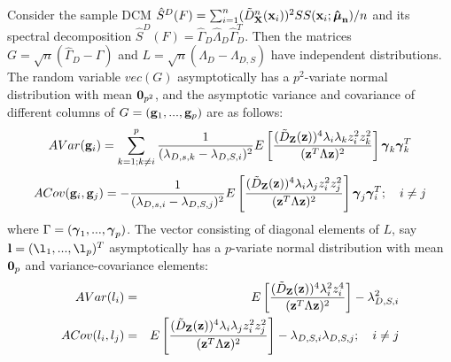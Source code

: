 \documentclass[fleqn,11pt]{article}
\begin{document}
\begin{Corollary} \label{Corollary:eigendist}
Consider the sample DCM $ \hat S^D(F) = \sum_{i=1}^n (\tilde D^n_{\mathbf{X}} ({\bf{x}}_i))^2 SS({\bf{x}}_i; {\bf \hat{{\boldsymbol{\mu}}}_n})/n $ and its spectral decomposition $\hat S^D(F) = \hat\Gamma_D \hat\Lambda_D \hat\Gamma_D^T $. Then the matrices $G = \sqrt n (\hat\Gamma_D - \Gamma) $ and $L = \sqrt n (\hat\Lambda_D - \Lambda_{D,S}) $ have independent distributions. The random variable $vec(G)$ asymptotically has a $p^2$-variate normal distribution with mean ${\bf 0}_{p^2}$, and the asymptotic variance and covariance of different columns of $G = ({\bf{g}}_1,...,{\bf{g}}_p)$ are as follows:
%
\begin{equation} \label{equation:DevEq}
AVar({\bf{g}}_i) = \sum_{k=1; k \neq i}^p \frac{1}{(\lambda_{D,s,k} - \lambda_{D,S,i})^2} E \left[ \frac{(\tilde D_{\mathbf{Z}} ({\bf{z}}))^4 \lambda_i \lambda_k z_i^2 z_k^2}{({\bf{z}}^T \Lambda {\bf{z}})^2} \right] {\boldsymbol{\gamma}}_k {\boldsymbol{\gamma}}_k^T
\end{equation}
%
\begin{equation}
ACov({\bf{g}}_i, {\bf{g}}_j) = - \frac{1}{(\lambda_{D,s,i} - \lambda_{D,S,j})^2} E \left[ \frac{(\tilde D_{\mathbf{Z}} ({\bf{z}}))^4 \lambda_i \lambda_j z_i^2 z_j^2}{({\bf{z}}^T \Lambda {\bf{z}})^2} \right] {\boldsymbol{\gamma}}_j {\boldsymbol{\gamma}}_i^T; \quad i \neq j
\end{equation}
%
where $\Gamma = ({\boldsymbol{\gamma}}_1,...,{\boldsymbol{\gamma}}_p)$. The vector consisting of diagonal elements of $L$, say $\bfl = (\l_1,...,\l_p)^T$ asymptotically has a $p$-variate normal distribution with mean ${\bf 0}_p$ and variance-covariance elements:
%
\begin{eqnarray}
AVar(l_i) &=& E \left[ \frac{(\tilde D_{\mathbf{Z}} ({\bf{z}}))^4 \lambda_i^2 z_i^4}{({\bf{z}}^T \Lambda {\bf{z}})^2} \right] - \lambda_{D,S,i}^2\\
ACov(l_i, l_j) &=& E \left[ \frac{(\tilde D_{\mathbf{Z}} ({\bf{z}}))^4 \lambda_i \lambda_j z_i^2 z_j^2}{({\bf{z}}^T \Lambda {\bf{z}})^2} \right] - \lambda_{D,S,i} \lambda_{D,S,j}; \quad i \neq j
\end{eqnarray}
%
\end{Corollary}

\end{document}

